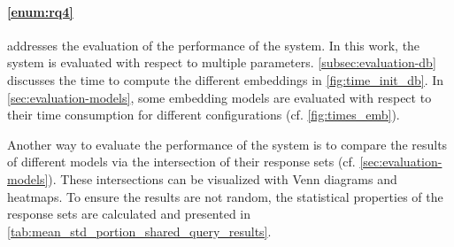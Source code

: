\paragraph{\ref{enum:rq4}} addresses the evaluation of the performance of the system.
In this work, the system is evaluated with respect to multiple parameters.
\autoref{subsec:evaluation-db} discusses 
the time to compute the different embeddings in \autoref{fig:time_init_db}.
In \autoref{sec:evaluation-models}, some embedding models are evaluated 
with respect to their time consumption for different configurations (cf. \autoref{fig:times_emb}).

Another way to evaluate the performance of the system is to 
compare the results of different models via the intersection 
of their response sets (cf. \autoref{sec:evaluation-models}).
These intersections can be visualized with Venn diagrams and heatmaps.
To ensure the results are not random, 
the statistical properties of the response sets are calculated 
and presented in \autoref{tab:mean_std_portion_shared_query_results}.